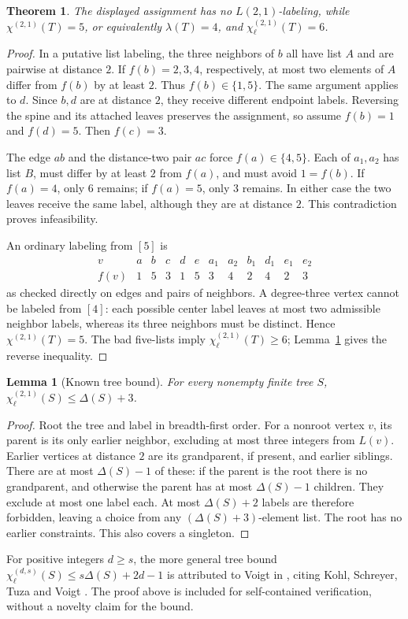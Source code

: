 \documentclass[11pt]{article}
\newtheorem{theorem}{Theorem}
\newtheorem{lemma}{Lemma}
\newcommand{\cp}{\chi^{(2,1)}}
\newcommand{\cl}{\chi_{\ell}^{(2,1)}}
\begin{document}
\begin{theorem}\label{thm:main}
The displayed assignment has no \(L(2,1)\)-labeling, while
\(\cp(T)=5\), or equivalently \(\lambda(T)=4\), and \(\cl(T)=6\).
\end{theorem}
\begin{proof}
In a putative list labeling, the three neighbors of \(b\) all have list \(A\)
and are pairwise at distance \(2\).
If \(f(b)=2,3,4\), respectively, at most two elements of \(A\)
differ from \(f(b)\) by at least \(2\). Thus \(f(b)\in\{1,5\}\).
The same argument applies to \(d\).
Since \(b,d\) are at distance \(2\), they receive different endpoint labels.
Reversing the spine and its attached leaves preserves the assignment,
so assume \(f(b)=1\) and \(f(d)=5\). Then \(f(c)=3\).

The edge \(ab\) and the distance-two pair \(ac\) force \(f(a)\in\{4,5\}\).
Each of \(a_1,a_2\) has list \(B\), must differ by at least \(2\) from \(f(a)\),
and must avoid \(1=f(b)\).
If \(f(a)=4\), only \(6\) remains; if \(f(a)=5\), only \(3\) remains.
In either case the two leaves receive the same label, although they are
at distance \(2\). This contradiction proves infeasibility.

An ordinary labeling from \([5]\) is
\[
\begin{array}{c|rrrrrrrrrrr}
 v & a&b&c&d&e&a_1&a_2&b_1&d_1&e_1&e_2\\ \hline
 f(v)&1&5&3&1&5&3&4&2&4&2&3
\end{array}
\]
as checked directly on edges and pairs of neighbors.
A degree-three vertex cannot be labeled from \([4]\): each possible center
label leaves at most two admissible neighbor labels, whereas its three
neighbors must be distinct. Hence \(\cp(T)=5\).
The bad five-lists imply \(\cl(T)\geq6\); Lemma~\ref{lem:bound} gives
the reverse inequality.
\end{proof}

\begin{lemma}[Known tree bound]\label{lem:bound}
For every nonempty finite tree \(S\),
\(\cl(S)\leq\Delta(S)+3\).
\end{lemma}
\begin{proof}
Root the tree and label in breadth-first order.
For a nonroot vertex \(v\), its parent is its only earlier neighbor,
excluding at most three integers from \(L(v)\).
Earlier vertices at distance \(2\) are its grandparent, if present,
and earlier siblings. There are at most \(\Delta(S)-1\) of these:
if the parent is the root there is no grandparent, and otherwise
the parent has at most \(\Delta(S)-1\) children.
They exclude at most one label each.
At most \(\Delta(S)+2\) labels are therefore forbidden, leaving a choice
from any \((\Delta(S)+3)\)-element list. The root has no earlier constraints.
This also covers a singleton.
\end{proof}
For positive integers \(d\geq s\), the more general tree bound
\(\chi_{\ell}^{(d,s)}(S)\leq s\Delta(S)+2d-1\)
is attributed to Voigt in \cite[p.~416 and reference~8 on p.~417]{kohl-owr},
citing Kohl, Schreyer, Tuza and Voigt \cite{kstv}.
The proof above is included for self-contained verification, without a
novelty claim for the bound.
\end{document}
